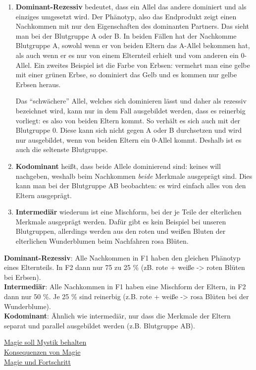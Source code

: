 \begin{enumerate}
	\item \textbf{Dominant-Rezessiv} bedeutet, dass ein Allel das andere dominiert und als einziges umgesetzt wird. 
	Der Phänotyp, also das Endprodukt zeigt einen Nachkommen mit nur den Eigenschaften des dominanten Partners.
	Das sieht man bei der Blutgruppe A oder B.
	In beiden Fällen hat der Nachkomme Blutgruppe A, sowohl wenn er von beiden Eltern das A-Allel bekommen hat, als auch wenn er es nur von einem Elternteil erhielt und vom anderen ein 0-Allel.
	Ein zweites Beispiel ist die Farbe von Erbsen: vermehrt man eine gelbe mit einer grünen Erbse, so dominiert das Gelb und es kommen nur gelbe Erbsen heraus.
	
	Das "`schwächere"' Allel, welches sich dominieren lässt und daher als rezessiv bezeichnet wird, kann nur in dem Fall ausgebildet werden, dass es reinerbig vorliegt: es also von beiden Eltern kommt.
	So verhält es sich auch mit der Blutgruppe 0.
	Diese kann sich nicht gegen A oder B durchsetzen und wird nur ausgebildet, wenn von beiden Eltern ein 0-Allel kommt.
	Deshalb ist es auch die seltenste Blutgruppe.
	\item \textbf{Kodominant} heißt, dass beide Allele dominierend sind: keines will nachgeben, weshalb beim Nachkommen \textit{beide}  Merkmale ausgeprägt sind.
	Dies kann man bei der Blutgruppe AB beobachten: es wird einfach alles von den Eltern ausgeprägt.
	\item \textbf{Intermediär} wiederum ist eine Mischform, bei der je Teile der elterlichen Merkmale ausgeprägt werden. 
	Dafür gibt es kein Beispiel bei unseren Blutgruppen, allerdings werden aus den roten und weißen Bluten der elterlichen Wunderblumen beim Nachfahren rosa Blüten.
\end{enumerate}



\textbf{Dominant-Rezessiv}: Alle Nachkommen in F1 haben den gleichen Phänotyp eines Elternteils. In F2 dann nur 75 zu 25 \% (zB. rote + weiße -> roten Blüten bei Erbsen). \\
\textbf{Intermediär}: Alle Nachkommen in F1 haben eine Mischform der Eltern, in F2 dann nur 50 \%. Je 25 \% sind reinerbig (z.B. rote + weiße -> rosa Blüten bei der Wunderblume). \\
\textbf{Kodominant}: Ähnlich wie intermediär, nur dass die Merkmale der Eltern separat und parallel ausgebildet werden (z.B. Blutgruppe AB).


\href{http://www.weltenbau-wissen.de/2015/12/magie-weltenbau-magiesystem-mystik-wissenschaft-teil-1/}{Magie soll Mystik behalten}\\
\href{http://www.weltenbau-wissen.de/2016/01/6-konsequenzen-magie/}{Konsequenzen von Magie}\\
\href{https://meisterperson.wordpress.com/2016/05/05/magie-fortschritt/?pk_campaign=pifeed\&pk_kwd=magie-fortschritt}{Magie und Fortschritt}